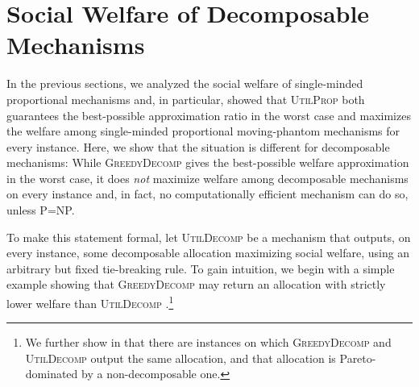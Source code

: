 \documentclass[11pt]{article}
\newcommand{\UtP}{\textsc{UtilProp} }
\newcommand{\GrdDec}{\textsc{GreedyDecomp} }
\newcommand{\UtDec}{\textsc{UtilDecomp} }
\begin{document}
\section{Social Welfare of Decomposable Mechanisms} \label{sec:optimal_decomposable}

In the previous sections, we analyzed the social welfare of single-minded proportional mechanisms and, in particular, showed that \UtP both guarantees the best-possible approximation ratio in the worst case and maximizes the welfare among single-minded proportional moving-phantom mechanisms for every instance.
Here, we show that the situation is different for decomposable mechanisms: While \GrdDec gives the best-possible welfare approximation in the worst case, it does \textit{not} maximize welfare among decomposable mechanisms on every instance and, in fact, no computationally efficient mechanism can do so, unless P=NP. 

To make this statement formal, let \UtDec be a mechanism that outputs, on every instance, some decomposable allocation maximizing social welfare, using an arbitrary but fixed tie-breaking rule. To gain intuition, we begin with a simple example showing that \GrdDec 
may return an allocation with strictly lower welfare than \UtDec.\footnote{
We further show in  that there are instances on which \GrdDec and \UtDec output the same allocation, and that allocation is Pareto-dominated by a non-decomposable one.}
\end{document}
